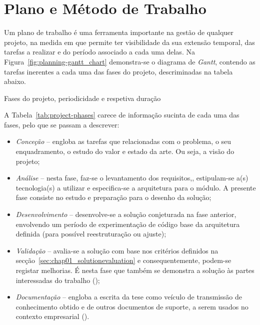 \section{Plano e Método de Trabalho}
\label{sec:chap01_workmethodology}
Um plano de trabalho é uma ferramenta importante na gestão de qualquer projeto, na medida em que permite ter visibilidade da sua extensão temporal, das tarefas a realizar e do período associado a cada uma delas. Na Figura~\ref{fig:planning-gantt_chart} demonstra-se o diagrama de \textit{Gantt}, contendo as tarefas inerentes a cada uma das fases do projeto, descriminadas na tabela abaixo.

\begin{table}[!ht]
\caption{Fases do projeto, periodicidade e respetiva duração}
\label{tab:project-phases}
\centering
\resizebox{\textwidth}{!}{}
\end{table}

A Tabela~\ref{tab:project-phases} carece de informação sucinta de cada uma das fases, pelo que se passam a descrever:

\begin{itemize}
    \item
    {
        \textit{Conceção} -- engloba as tarefas que relacionadas com o problema, o seu enquadramento, o estudo do valor e estado da arte. Ou seja, a visão do projeto;
    }
    \item
    {
        \textit{Análise} -- nesta fase, faz-se o levantamento dos requisitos,, estipulam-se a(s) tecnologia(s) a utilizar e especifica-se a arquitetura para o módulo. A presente fase consiste no estudo e preparação para o desenho da solução; 
    }
    \item
    {
        \textit{Desenvolvimento} -- desenvolve-se a solução conjeturada na fase anterior, envolvendo um período de experimentação de código base da arquitetura definida (para possível reestruturação ou ajuste);
    }
    \item
    {
        \textit{Validação} -- avalia-se a solução com base nos critérios definidos na secção~\ref{sec:chap01_solutionevaluation} e consequentemente, podem-se registar melhorias. É nesta fase que também se demonstra a solução às partes interessadas do trabalho ();
    }
    \item
    {
        \textit{Documentação} -- engloba a escrita da tese como veículo de transmissão de conhecimento obtido e de outros documentos de suporte, a serem usados no contexto empresarial ().
    }
\end{itemize}


